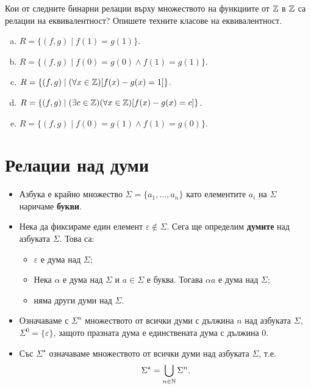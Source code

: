 \begin{problem}
  Кои от следните бинарни релации върху множеството на функциите от $\mathbb{Z}$ в $\mathbb{Z}$
  са релации на еквивалентност? Опишете техните класове на еквивалентност.
  \begin{enumerate}[a)]
  \item
    $R = \{(f,g)\mid f(1) = g(1)\}$.
  \item
    $R = \{(f,g)\mid f(0) = g(0)\wedge f(1) = g(1)\}$.
  \item
    $R =\{(f,g)\mid (\forall x\in\mathbb{Z})[f(x)-g(x) = 1]\}$.
  \item
    $R = \{(f,g)\mid (\exists c\in\mathbb{Z})(\forall x\in\mathbb{Z})[f(x)-g(x) = c]\}$.
  \item
    $R = \{(f,g)\mid f(0) = g(1)\wedge f(1) = g(0)\}$.
  \end{enumerate}
\end{problem}

\section{Релации над думи}

\begin{itemize}
\item
  Азбука е крайно множество $\Sigma = \{a_1,\dots,a_n\}$ като елементите $a_i$ на $\Sigma$ наричаме {\bf букви}.
\item
  Нека да фиксираме един елемент $\varepsilon \not\in \Sigma$.
  Сега ще определим {\bf думите} над азбуката $\Sigma$. Това са:
  \begin{itemize}
  \item
    $\varepsilon$ е дума над $\Sigma$;
  \item
    Нека $\alpha$ е дума над $\Sigma$ и $a \in \Sigma$ е буква.
    Тогава $\alpha a$ е дума над $\Sigma$;
  \item
    няма други думи над $\Sigma$.
  \end{itemize}
\item
  Означаваме с $\Sigma^n$ множеството от всички думи с дължина $n$ над азбуката $\Sigma$, $\Sigma^0 = \{\varepsilon\}$,
  защото празната дума е единствената дума с дължина $0$.
\item
  Със $\Sigma^\star$ означаваме множеството от всички думи над азбуката $\Sigma$, т.е.
  \marginpar{$0 \in \Nat$}
  \[\Sigma^\star = \bigcup_{n\in\mathbb{N}} \Sigma^{n}.\]
\end{itemize}

